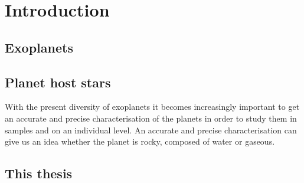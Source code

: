 \chapter{Introduction}
\label{cha:introduction}


\section{Exoplanets}
\label{sec:exoplanets}



\section{Planet host stars}
\label{sec:Planet_host_stars}

With the present diversity of exoplanets it becomes increasingly important to get an accurate and
precise characterisation of the planets in order to study them in samples and on an individual
level. An accurate and precise characterisation can give us an idea whether the planet is rocky,
composed of water or gaseous.








\section{This thesis}
\label{sec:this_thesis}
